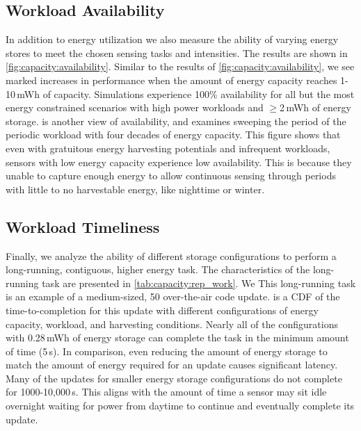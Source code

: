 
\subsection{Workload Availability}
\label{sec:capacity:availability}

In addition to energy utilization we also measure the ability of varying energy stores to meet the chosen 
sensing tasks and intensities. 
The results are
shown in \cref{fig:capacity:availability}. 
Similar to the results of \cref{fig:capacity:availability}, we see marked
increases in performance when the amount of energy capacity reaches 1-10\,mWh
of capacity.
Simulations experience 100\% availability for all but
the most energy constrained scenarios with high power workloads and
$\geq$2\,mWh of energy storage.
 is another view of availability, and examines sweeping the period of the periodic workload with four decades of energy capacity.
This figure shows that even 
with gratuitous energy harvesting potentials and infrequent workloads, sensors with low energy capacity experience low
availability.
This is because they
unable to capture enough energy to allow continuous sensing through periods with little to no harvestable energy, like nighttime or winter. 

\subsection{Workload Timeliness}
Finally, we analyze the ability of different storage configurations to perform a 
long-running, contiguous, higher energy task. 
The characteristics of the long-running task are presented in \cref{tab:capacity:rep_work}. We 
This long-running task is an example of a medium-sized, 50\ssi{\kilo\byte} over-the-air code update.
 is a CDF of the time-to-completion for this update with different configurations of energy capacity, workload, and harvesting conditions.
Nearly all of the configurations with
0.28\,mWh of energy storage can complete the task in the minimum amount of time (5\,s). In comparison,
even reducing the amount of energy storage to match the amount of energy
required for an update causes significant latency. 
Many of the updates for smaller energy storage configurations
do not complete for 1000-10,000\,s.
This aligns with the amount of time a sensor may sit
idle overnight waiting for power from daytime to continue and eventually complete its update.



